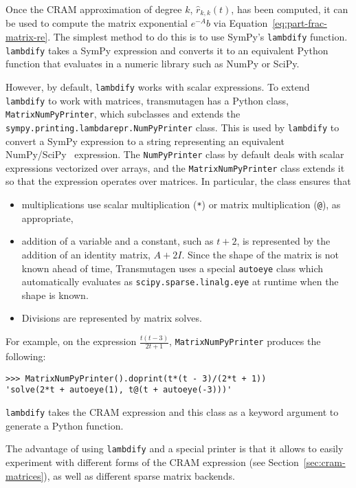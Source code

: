 Once the CRAM approximation of degree $k$, $\hat{r}_{k, k}(t)$, has been
computed, it can be used to compute the matrix exponential $e^{-A}b$ via
Equation~\ref{eq:part-frac-matrix-re}. The simplest method to do this is to
use SymPy's \texttt{lambdify} function. \texttt{lambdify} takes a SymPy
expression and converts it to an equivalent Python function that evaluates in a
numeric library such as NumPy or SciPy.

However, by default, \texttt{lambdify} works with scalar expressions. To
extend \texttt{lambdify} to work with matrices, transmutagen has a Python class,
\texttt{MatrixNumPyPrinter}, which subclasses and extends the
\texttt{sympy.\allowbreak{}printing.\allowbreak{}lambdarepr.\allowbreak{}NumPyPrinter} class. This is used by
\texttt{lambdify} to convert a SymPy expression to a string representing
an equivalent NumPy/SciPy~\cite{ationneeded} expression. The
\texttt{NumPyPrinter} class by default deals with scalar expressions
vectorized over arrays, and the \texttt{MatrixNumPyPrinter} class extends it
so that the expression operates over matrices. In particular, the class
ensures that

\begin{itemize}
\item multiplications use scalar multiplication (\texttt{*}) or
  matrix multiplication (\texttt{@}), as appropriate,
\item addition of a variable and a constant, such as $t + 2$, is represented
  by the addition of an identity matrix, $A + 2I$. Since the shape of the
  matrix is not known ahead of time, Transmutagen uses a special
  \texttt{autoeye} class which automatically evaluates as
  \texttt{scipy.\allowbreak{}sparse.\allowbreak{}linalg.\allowbreak{}eye} at
  runtime when the shape is known.
\item Divisions are represented by matrix solves.
\end{itemize}

For example, on the expression $\frac{t \left(t - 3\right)}{2 t + 1}$,
\texttt{MatrixNumPyPrinter} produces the following:
\begin{verbatim}
>>> MatrixNumPyPrinter().doprint(t*(t - 3)/(2*t + 1))
'solve(2*t + autoeye(1), t@(t + autoeye(-3)))'
\end{verbatim}

\texttt{lambdify} takes the CRAM expression and this class as a keyword
argument to generate a Python function.

The advantage of using \texttt{lambdify} and a special printer is that it
allows to easily experiment with different forms of the CRAM expression (see
Section~\ref{sec:cram-matrices}), as well as different sparse matrix backends.

